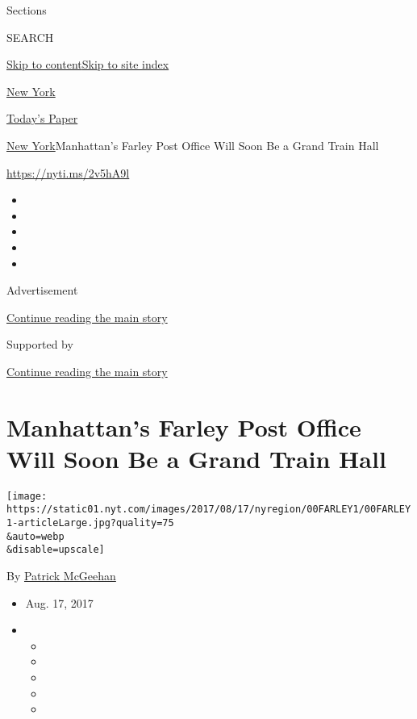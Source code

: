 Sections

SEARCH

\protect\hyperlink{site-content}{Skip to
content}\protect\hyperlink{site-index}{Skip to site index}

\href{https://www.nytimes.com/section/nyregion}{New York}

\href{https://myaccount.nytimes.com/auth/login?response_type=cookie\&client_id=vi}{}

\href{https://www.nytimes.com/section/todayspaper}{Today's Paper}

\href{/section/nyregion}{New York}\textbar{}Manhattan's Farley Post
Office Will Soon Be a Grand Train Hall

\url{https://nyti.ms/2v5hA9l}

\begin{itemize}
\item
\item
\item
\item
\item
\end{itemize}

Advertisement

\protect\hyperlink{after-top}{Continue reading the main story}

Supported by

\protect\hyperlink{after-sponsor}{Continue reading the main story}

\hypertarget{manhattans-farley-post-office-will-soon-be-a-grand-train-hall}{%
\section{Manhattan's Farley Post Office Will Soon Be a Grand Train
Hall}\label{manhattans-farley-post-office-will-soon-be-a-grand-train-hall}}

\texttt{[image: https://static01.nyt.com/images/2017/08/17/nyregion/00FARLEY1/00FARLEY1-articleLarge.jpg?quality=75\\\&auto=webp\\\&disable=upscale]}

By \href{http://www.nytimes.com/by/patrick-mcgeehan}{Patrick McGeehan}

\begin{itemize}
\item
  Aug. 17, 2017
\item
  \begin{itemize}
  \item
  \item
  \item
  \item
  \item
  \end{itemize}
\end{itemize}

